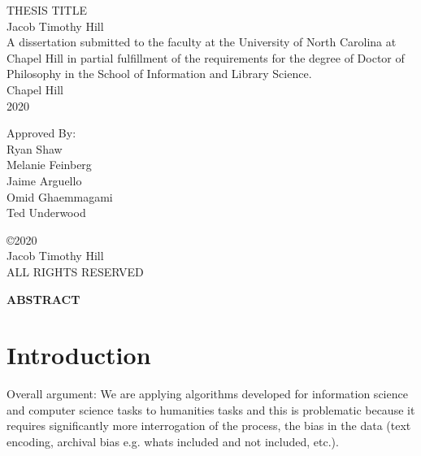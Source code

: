 \documentclass[12pt, oneside]{report}
\begin{document}
	\thispagestyle{empty}

	\begin{center}
		\singlespacing
		\vspace{4in}
		THESIS TITLE\\
		\vspace{1in}
		Jacob Timothy Hill\\
		\vspace{1in}
		A dissertation submitted to the faculty at the University of North Carolina at Chapel Hill in partial fulfillment of the requirements for the degree of Doctor of Philosophy in the School of Information and Library Science.\\
		\vspace{1in}
		Chapel Hill\\
		2020
		\vspace{1in}
	\end{center}
	\begin{raggedleft}
		Approved By:\\
		Ryan Shaw\\
		Melanie Feinberg\\
		Jaime Arguello\\
		Omid Ghaemmagami\\
		Ted Underwood\\
	\end{raggedleft}
\newpage
\begin{center}
	\vspace*{\fill}
	\copyright 2020\\
	Jacob Timothy Hill\\
	ALL RIGHTS RESERVED
	\vspace{1in}
\end{center}
\begin{center}
	\textbf{ABSTRACT}
\end{center}
\setlength{\parindent}{15pt}
\tableofcontents
\newpage
\listoffigures
\chapter{Introduction}
Overall argument: We are applying algorithms developed for information science and computer science tasks to humanities tasks and this is problematic because it requires significantly more interrogation of the process, the bias in the data (text encoding, archival bias e.g. whats included and not included, etc.).
\end{document}
